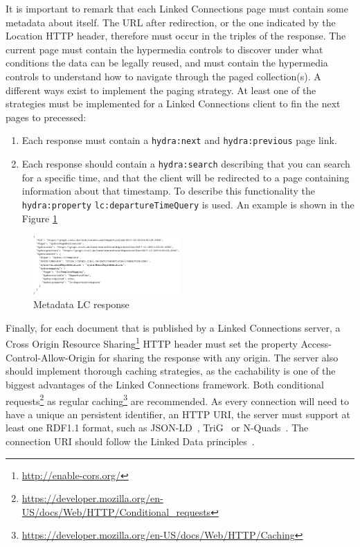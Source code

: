 \documentclass[sw]{iosart2x}
\begin{document}
It is important to remark that each Linked Connections page must contain some metadata about itself. The URL after redirection, or the one indicated by the Location HTTP header, therefore must occur in the triples of the response. The current page must contain the hypermedia controls to discover under what conditions the data can be legally reused, and must contain the hypermedia controls to understand how to navigate through the paged collection(s). A different ways exist to implement the paging strategy. At least one of the strategies must be implemented for a Linked Connections client to fin the next pages to precessed:
\begin{enumerate}
\item Each response must contain a \texttt{hydra:next} and \texttt{hydra:previous} page link.
\item Each response should contain a \texttt{hydra:search} describing that you can search for a specific time, and that the client will be redirected to a page containing information about that timestamp. To describe this functionality the \texttt{hydra:property} \texttt{lc:departureTimeQuery} is used. An example is shown in the Figure \ref{fig:metadata}
\end{enumerate}

\begin{figure}[t]
	\includegraphics[width=0.5\textwidth]{images/search.png}
	\caption{Metadata LC response}\label{fig:metadata}
\end{figure}

Finally, for each document that is published by a Linked Connections server, a Cross Origin Resource Sharing\footnote{\url{http://enable-cors.org/}} HTTP header must set the property Access-Control-Allow-Origin for sharing the response with any origin. The server also should implement thorough caching strategies, as the cachability is one of the biggest advantages of the Linked Connections framework. Both conditional requests\footnote{\url{https://developer.mozilla.org/en-US/docs/Web/HTTP/Conditional_requests}} as regular caching\footnote{\url{https://developer.mozilla.org/en-US/docs/Web/HTTP/Caching}} are recommended. As every connection will need to have a unique an persistent identifier, an HTTP URI, the server must support at least one RDF1.1 format, such as JSON-LD~\cite{world2014json}, TriG~\cite{bizer2014rdf} or N-Quads~\cite{cyganiak2008n}. The connection URI should follow the Linked Data principles~\cite{bizer2009linked}.
\end{document}
